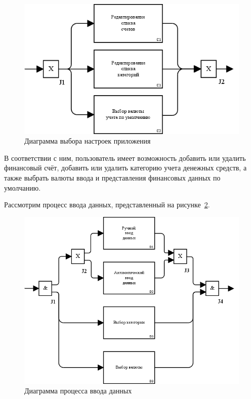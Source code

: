 \begin{figure}[h!]
  \centering
  \includegraphics[width=150mm]{pic/idef3_settings}
  \caption{Диаграмма выбора настроек приложения}
  \label{fig:idef3_settings}
\end{figure}

В соответствии с ним, пользователь имеет возможность
добавить или удалить финансовый счёт,
добавить или удалить категорию учета денежных средств,
а также выбрать валюты ввода и представления финансовых
данных по умолчанию.

\pagebreak
Рассмотрим процесс ввода данных,
представленный на рисунке~\ref{fig:idef3_input}.

\begin{figure}[h!]
  \centering
  \includegraphics[width=150mm]{pic/idef3_input}
  \caption{Диаграмма процесса ввода данных}
  \label{fig:idef3_input}
\end{figure}

